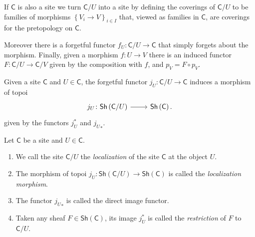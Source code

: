 \begin{rem}[]
	If $\mathsf{C}$ is also a site we turn $\mathsf{C}/U$ into a site
	by defining the coverings of $\mathsf{C}/U$ to be families
	of morphisms $\left\{ V_{ i } \to V \right\}_{ i \in I }$
	that, viewed as families in $\mathsf{C}$, are coverings for the
	pretopology on $\mathsf{C}$.

	Moreover there is a forgetful functor $f_U\colon \mathsf{C}/U \to \mathsf{C}$
	that simply forgets about the morphism.
	Finally, given a morphism $f\colon U \to V$ there is an induced
	functor $F\colon \mathsf{C}/U \to \mathsf{C}/V$ given
	by the composition with $f$, and $p_V = F \circ p_V$.
\end{rem}


\begin{lem}
	Given a site $\mathsf{C}$ and $U \in \mathsf{C}$, the forgetful functor
	$j_U\colon \mathsf{C}/U \to \mathsf{C}$ induces a
	morphism of topoi
	\begin{equation*}
	\begin{tikzcd}[row sep = 0ex
		,/tikz/column 1/.append style={anchor=base east}
		,/tikz/column 2/.append style={anchor=base west}]
		j_U\colon 
		\mathsf{Sh}\left(\mathsf{C}/U\right)\arrow[r, "", rightarrow] &
		\mathsf{Sh}\left(\mathsf{C}\right)
	.\end{tikzcd}
	\end{equation*} 
	given by the functors $j_U^*$ and ${j_U}_*$.
\end{lem} 


\begin{defn}[Localization]\label{defn:localizationTopoi}
	Let $\mathsf{C}$ be a site and $U \in \mathsf{C}$.
\begin{enumerate}
	\item We call the site $\mathsf{C}/U$ the {\em localization}
		of the site $\mathsf{C}$ at the object $U$.
	\item The morphism of topoi 
		$j_U\colon \mathsf{Sh}\left(\mathsf{C}/U\right) \to \mathsf{Sh}\left(\mathsf{C}\right)$
		is called the {\em localization morphism}.
	\item The functor ${j_U}_*$ is called the direct image functor.
	\item Taken any sheaf $F \in \mathsf{Sh}\left(\mathsf{C}\right)$,
		its image $j_U^*$ is called the {\em restriction} of $F$ to $\mathsf{C}/U$.
\end{enumerate}
\end{defn}


